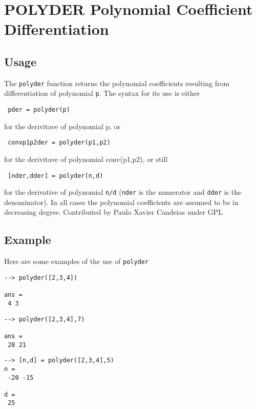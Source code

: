 \section{POLYDER Polynomial Coefficient Differentiation}

\subsection{Usage}

The \verb|polyder| function returns the polynomial coefficients resulting
from differentiation of polynomial \verb|p|. The syntax for its use is either
\begin{verbatim}
 pder = polyder(p)
\end{verbatim}
 for the derivitave of polynomial p, or
\begin{verbatim}
 convp1p2der = polyder(p1,p2)
\end{verbatim}
 for the derivitave of polynomial conv(p1,p2), or still
\begin{verbatim}
 [nder,dder] = polyder(n,d)
\end{verbatim}
for the derivative of polynomial \verb|n/d| (\verb|nder| is the numerator
and \verb|dder| is the denominator). In all cases the polynomial 
coefficients are assumed to be in decreasing degree.
Contributed by Paulo Xavier Candeias under GPL
\subsection{Example}

Here are some examples of the use of \verb|polyder|
\begin{verbatim}
--> polyder([2,3,4])

ans = 
 4 3 
\end{verbatim}
\begin{verbatim}
--> polyder([2,3,4],7)

ans = 
 28 21 
\end{verbatim}
\begin{verbatim}
--> [n,d] = polyder([2,3,4],5)
n = 
 -20 -15 

d = 
 25 
\end{verbatim}
